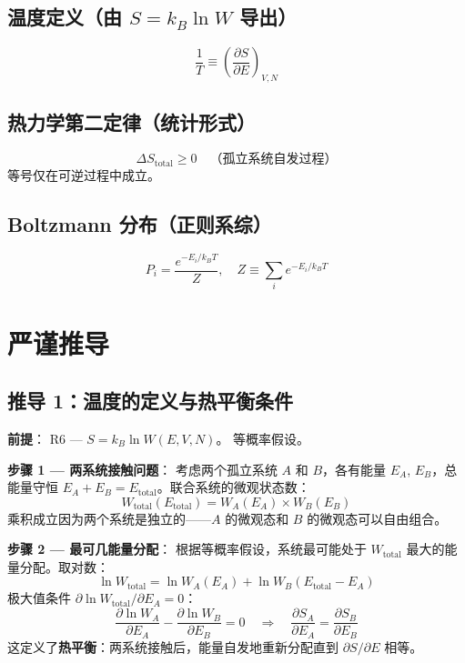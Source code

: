 \subsection{温度定义（由 $S = k_B \ln W$ 导出）}
\[
\frac{1}{T} \equiv \left(\frac{\partial S}{\partial E}\right)_{V, N}
\]

\subsection{热力学第二定律（统计形式）}
\[
\Delta S_{\text{total}} \ge 0 \quad \text{（孤立系统自发过程）}
\]
等号仅在可逆过程中成立。

\subsection{Boltzmann 分布（正则系综）}
\[
P_i = \frac{e^{-E_i/k_B T}}{Z}, \quad Z \equiv \sum_i e^{-E_i/k_B T}
\]

\section{严谨推导}

\subsection{推导 1：温度的定义与热平衡条件}

\textbf{前提}：\fbox{[N]} R6 — $S = k_B\ln W(E,V,N)$。\fbox{[N]} 等概率假设。

\textbf{步骤 1 — 两系统接触问题}：\fbox{[S]} 考虑两个孤立系统 $A$ 和 $B$，各有能量 $E_A$, $E_B$，总能量守恒 $E_A + E_B = E_{\text{total}}$。联合系统的微观状态数：
\begin{equation}
W_{\text{total}}(E_{\text{total}}) = W_A(E_A) \times W_B(E_B)
\end{equation}
\fbox{[S]} 乘积成立因为两个系统是独立的——$A$ 的微观态和 $B$ 的微观态可以自由组合。

\textbf{步骤 2 — 最可几能量分配}：\fbox{[S]} 根据等概率假设，系统最可能处于 $W_{\text{total}}$ 最大的能量分配。取对数：
\begin{equation}
\ln W_{\text{total}} = \ln W_A(E_A) + \ln W_B(E_{\text{total}} - E_A)
\end{equation}
极大值条件 $\partial\ln W_{\text{total}}/\partial E_A = 0$：
\begin{equation}
\frac{\partial \ln W_A}{\partial E_A} - \frac{\partial \ln W_B}{\partial E_B} = 0
\quad\Rightarrow\quad
\frac{\partial S_A}{\partial E_A} = \frac{\partial S_B}{\partial E_B}
\end{equation}
\fbox{[S]} 这定义了\textbf{热平衡}：两系统接触后，能量自发地重新分配直到 $\partial S/\partial E$ 相等。

